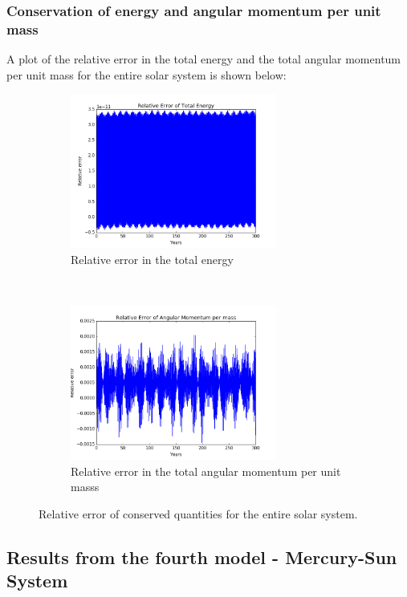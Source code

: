 \documentclass[a4paper, 10pt]{article}
\begin{document}
\subsubsection{Conservation of energy and angular momentum per unit mass}
A plot of the relative error in the total energy and the total angular momentum per unit mass for the entire solar system is shown below:
\begin{figure}[!ht]
    \centering
    \begin{subfigure}[H!]{0.5\textwidth}
        \centering
        \includegraphics[height=2.0in]{relErrEnFull.png}
        \caption{Relative error in the total energy}
    \end{subfigure}%
    ~ 
    \begin{subfigure}[H!]{0.5\textwidth}
        \centering
        \includegraphics[height=2.0in]{relErrMomFull.png}
        \caption{Relative error in the total angular momentum per unit masss}
    \end{subfigure}
    \caption{Relative error of conserved quantities for the entire solar system.} \label{fig:error_full_solar_system}
\end{figure}
\newpage

\subsection{Results from the fourth model - Mercury-Sun System}
\end{document}
